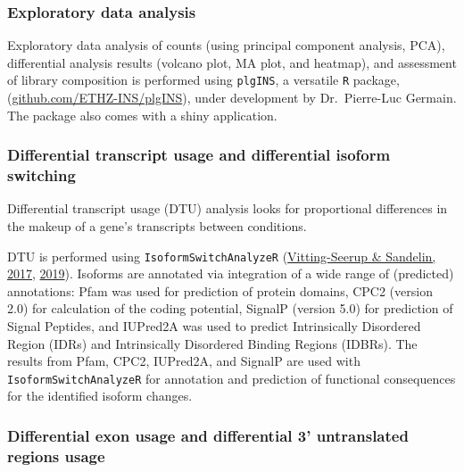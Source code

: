 \documentclass[12pt,twoside]{reedthesis}
\begin{document}
\hypertarget{m3.2.4}{%
\subsubsection*{Exploratory data analysis}\label{m3.2.4}}

Exploratory data analysis of counts (using principal component analysis,
PCA), differential analysis results (volcano plot, MA plot, and
heatmap), and assessment of library composition is performed using
\texttt{plgINS}, a versatile \texttt{R} package, (\href{https://github.com/ETHZ-INS/plgINS}{github.com/ETHZ-INS/plgINS}),
under development by Dr.~Pierre-Luc Germain. The package also comes with
a shiny application.

\hypertarget{m3.2.5}{%
\subsubsection*{Differential transcript usage and differential isoform switching}\label{m3.2.5}}

Differential transcript usage (DTU) analysis looks for proportional
differences in the makeup of a gene's transcripts between conditions.

DTU is performed using \texttt{IsoformSwitchAnalyzeR} (\protect\hyperlink{ref-vitting-seerup2017}{Vitting-Seerup \& Sandelin, 2017}, \protect\hyperlink{ref-vitting-seerup2019}{2019}). Isoforms are annotated via integration of a wide
range of (predicted) annotations: Pfam was used for prediction of
protein domains, CPC2 (version 2.0) for calculation of the coding
potential, SignalP (version 5.0) for prediction of Signal Peptides, and
IUPred2A was used to predict Intrinsically Disordered Region (IDRs) and
Intrinsically Disordered Binding Regions (IDBRs). The results from Pfam,
CPC2, IUPred2A, and SignalP are used with \texttt{IsoformSwitchAnalyzeR} for
annotation and prediction of functional consequences for the identified
isoform changes.

\hypertarget{m3.2.6}{%
\subsubsection*{Differential exon usage and differential 3' untranslated regions usage}\label{m3.2.6}}
\end{document}
